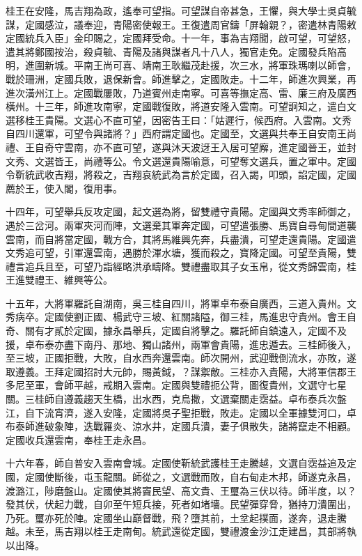 \begin{pinyinscope}
桂王在安隆，馬吉翔為政，遙奉可望指。可望謀自帝甚急，王懼，與大學士吳貞毓謀，定國感泣，議奉迎，青陽密使報王。王復遣周官鑄「屏翰親？，密遣林青陽敕定國統兵入臣」金印賜之，定國拜受命。十一年，事為吉翔聞，啟可望，可望怒，遣其將鄭國按治，殺貞毓、青陽及諸與謀者凡十八人，獨官走免。定國發兵陷高明，進圍新城。平南王尚可喜、靖南王耿繼茂赴援，次三水，將軍珠瑪喇以師會，戰於珊洲，定國兵敗，退保新會。師進擊之，定國敗走。十二年，師進次興業，再進次潢州江上。定國戰屢敗，乃道賓州走南寧。可喜等撫定高、雷、廉三府及廣西橫州。十三年，師進攻南寧，定國戰復敗，將道安隆入雲南。可望詗知之，遣白文選移桂王貴陽。文選心不直可望，因密告王曰：「姑遲行，候西府。入雲南。文秀自四川還軍，可望令與諸將？」西府謂定國也。定國至，文選與共奉王自安南王尚禮、王自奇守雲南，亦不直可望，遂與沐天波迓王入居可望廨，進定國晉王，並封文秀、文選皆王，尚禮等公。令文選還貴陽喻意，可望奪文選兵，置之軍中。定國令靳統武收吉翔，將殺之，吉翔哀統武為言於定國，召入謁，叩頭，諂定國，定國薦於王，使入閣，復用事。

十四年，可望舉兵反攻定國，起文選為將，留雙禮守貴陽。定國與文秀率師御之，遇於三岔河。兩軍夾河而陣，文選棄其軍奔定國，可望遣張勝、馬寶自尋甸間道襲雲南，而自將當定國，戰方合，其將馬維興先奔，兵盡潰，可望走還貴陽。定國遣文秀追可望，引軍還雲南，遇勝於渾水塘，獲而殺之，寶降定國。可望至貴陽，雙禮言追兵且至，可望乃詣經略洪承疇降。雙禮盡取其子女玉帛，從文秀歸雲南，桂王進雙禮王、維興等公。

十五年，大將軍羅託自湖南，吳三桂自四川，將軍卓布泰自廣西，三道入貴州。文秀病卒。定國使劉正國、楊武守三坡、紅關諸隘，御三桂，馬進忠守貴州。會王自奇、關有才貳於定國，據永昌舉兵，定國自將擊之。羅託師自鎮遠入，定國不及援，卓布泰亦盡下南丹、那地、獨山諸州，兩軍會貴陽，進忠遁去。三桂師後入，至三坡，正國拒戰，大敗，自水西奔還雲南。師次開州，武迎戰倒流水，亦敗，遂取遵義。王拜定國招討大元帥，賜黃鉞，？謀禦敵。三桂亦入貴陽，大將軍信郡王多尼至軍，會師平越，戒期入雲南。定國與雙禮扼公背，圖復貴州，文選守七星關。三桂師自遵義趨天生橋，出水西，克烏撒，文選棄關走霑益。卓布泰兵次盤江，自下流宵濟，遂入安隆，定國將吳子聖拒戰，敗走。定國以全軍據雙河口，卓布泰師進破象陣，迭戰羅炎、涼水井，定國兵潰，妻子俱散失，諸將竄走不相顧。定國收兵還雲南，奉桂王走永昌。

十六年春，師自普安入雲南會城。定國使靳統武護桂王走騰越，文選自霑益追及定國，定國使斷後，屯玉龍關。師從之，文選戰而敗，自右甸走木邦，師遂克永昌，渡潞江，陟磨盤山。定國使其將竇民望、高文貴、王璽為三伏以待。師半度，以？發其伏，伏起力戰，自卯至午短兵接，死者如堵墻。民望彈穿脅，猶持刀潰圍出，乃死。璽亦死於陣。定國坐山巔督戰，飛？墮其前，土坌起撲面，遂奔，退走騰越。未至，馬吉翔以桂王走南甸。統武還從定國，雙禮渡金沙江走建昌，其部將執以出降。


\end{pinyinscope}
